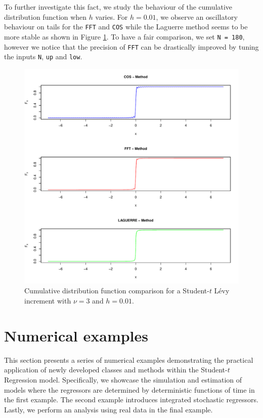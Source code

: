 To further investigate this fact, we study the behaviour of the cumulative distribution function when \(h\) varies. For \(h= 0.01\), we observe an oscillatory behaviour on tails for the \texttt{FFT} and \texttt{COS} while the Laguerre method seems to be more stable as shown in Figure \ref{fig:CDFComparisonnu3h001}. To have a fair comparison, we set \texttt{N\ =\ 180}, however we notice that the precision of \texttt{FFT} can be drastically improved by tuning the inputs \texttt{N}, \texttt{up} and \texttt{low}.

\begin{figure}

{\centering \includegraphics[width=1\linewidth]{figures/CDF_Comparison_nu3_h001} 

}

\caption{Cumulative distribution function comparison for a Student-$t$ Lévy increment with $\nu=3$ and $h=0.01$.}\label{fig:CDFComparisonnu3h001}
\end{figure}

\section{Numerical examples}\label{sec-NE}

This section presents a series of numerical examples demonstrating the practical application of newly developed classes and methods within the Student-\(t\) Regression model. Specifically, we showcase the simulation and estimation of models where the regressors are determined by deterministic functions of time in the first example. The second example introduces integrated stochastic regressors. Lastly, we perform an analysis using real data in the final example.

